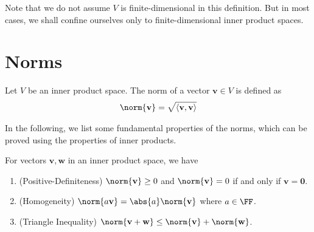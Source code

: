 \documentclass[thmcnt=section, color=blue, 12pt]{my-elegantbook}
\begin{document}
\begin{remark}
    Note that we do not assume $V$ is finite-dimensional in this definition. But in most cases, we shall confine ourselves only to finite-dimensional inner product spaces. 
\end{remark}


\section{Norms}


\begin{definition}
    Let $V$ be an inner product space. The norm of a vector $\mathbf{v} \in V$ is defined as 
    \begin{align*}
        \norm{\mathbf{v}} = \sqrt{\left\langle \mathbf{v}, \mathbf{v} \right\rangle}
    \end{align*}
\end{definition}


\par In the following, we list some fundamental properties of the norms, which can be proved using the properties of inner products.

\begin{proposition}
    For vectors $\mathbf{v}, \mathbf{w}$ in an inner product space, we have 
    \begin{enumerate}
        \item (Positive-Definiteness) $\norm{\mathbf{v}} \geq 0$ and $\norm{\mathbf{v}} = 0$ if and only if $\mathbf{v} = \mathbf{0}$.
        \item (Homogeneity) $\norm{a \mathbf{v}} = \abs{a} \norm{\mathbf{v}}$ where $a \in \FF$.
        \item (Triangle Inequality) $\norm{\mathbf{v} + \mathbf{w}} \leq \norm{\mathbf{v}} + \norm{\mathbf{w}}$.
    \end{enumerate}
\end{proposition}
\end{document}
